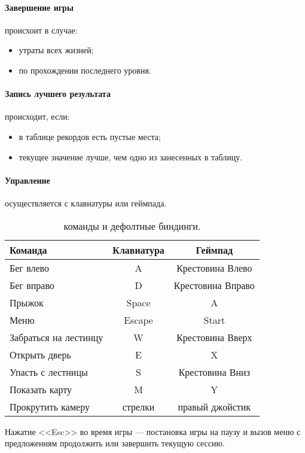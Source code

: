 \documentclass[12pt,a4paper,fullpage,titlepage]{article}
\begin{document}
\paragraph{Завершение игры} происхоит в случае:
\begin{itemize}
	\item утраты всех жизней;
	\item по прохождении последнего уровня.
\end{itemize}

\paragraph{Запись лучшего результата} происходит, если:
\begin{itemize}
	\item в таблице рекордов есть пустые места;
	\item текущее значение лучше, чем одно из занесенных в таблицу.
\end{itemize}

\paragraph{Управление} осуществляется с клавиатуры или геймпада.\\
\begin{table}[h]
\begin{tabularx}{\textwidth}{|X|c|c|}
	\hline
	Команда & Клавиатура & Геймпад\\
	\hline
	Бег влево & A & Крестовина Влево \\
	\hline
	Бег вправо & D & Крестовина Вправо \\
	\hline
	Прыжок & Space & A \\
	\hline
	Меню & Escape & Start \\
	\hline
	Забраться на лестинцу & W & Крестовина Вверх \\
	\hline
	Открыть дверь & E & X \\
	\hline
	Упасть с лестницы & S & Крестовина Вниз \\
	\hline
	Показать карту & M & Y \\
	\hline
	Прокрутить камеру & стрелки & правый джойстик \\
	\hline
\end{tabularx}
\caption{команды и дефолтные биндинги.}
\end{table}

Нажатие <<Esc>> во время игры --- постановка игры на паузу и вызов меню с предложениям продолжить или завершить текущую сессию.\\
\end{document}
